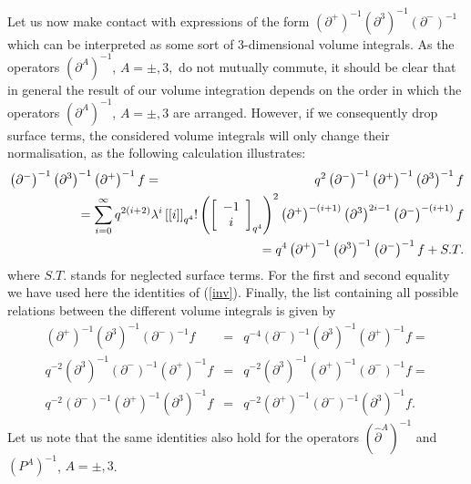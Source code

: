\documentclass[a4paper,11pt,oneside]{article}
\begin{document}
Let us now make contact with expressions of the form $\left( \partial
^{+}\right) ^{-1}\left( \partial ^{3}\right) ^{-1}\left( \partial
^{-}\right) ^{-1}$ which can be interpreted as some sort of 3-dimensional
volume integrals. As the operators $\left( \partial ^{A}\right) ^{-1}$, $%
A=\pm ,3,$ do not mutually commute, it should be clear that in general the
result of our volume integration depends on the order in which the operators 
$\left( \partial ^{A}\right) ^{-1}$, $A=\pm ,3$ are arranged. However, if we
consequently drop surface terms, the considered volume integrals will only
change their normalisation, as the following calculation illustrates: 
\begin{eqnarray}
\left( \partial ^{-}\right) ^{-1}\left( \partial ^{3}\right) ^{-1}\left(
\partial ^{+}\right) ^{-1}f &=&q^{2}\left( \partial ^{-}\right) ^{-1}\left(
\partial ^{+}\right) ^{-1}\left( \partial ^{3}\right) ^{-1}f \\
&&\hspace*{-2.5cm}=\sum_{i=0}^{\infty }q^{2\left( i+2\right) }\lambda
^{i}\left[ \left[ i\right] \right] _{q^{4}}!\left(\left[
    \begin{array}{c} -1\\i\end{array} \right]_{q^{4}}\right)
^{2}\left( \partial ^{+}\right) ^{-\left( i+1\right) }\left( \partial
^{3}\right) ^{2i-1}\left( \partial ^{-}\right) ^{-\left( i+1\right) }f 
\nonumber \\
&&\hspace*{-2.5cm}=q^{4}\left( \partial ^{+}\right) ^{-1}\left( \partial
^{3}\right) ^{-1}\left( \partial ^{-}\right) ^{-1}f+S.T.  \nonumber
\end{eqnarray}
where $S.T.$ stands for neglected surface terms. For the first and
second equality we have used here the identities of
(\ref{inv}). Finally, the list
containing all possible relations between the different volume integrals is
given by 
\begin{eqnarray}
\left( \partial ^{+}\right) ^{-1}\left( \partial ^{3}\right) ^{-1}\left(
\partial ^{-}\right) ^{-1}f &=&q^{-4}\left( \partial ^{-}\right) ^{-1}\left(
\partial ^{3}\right) ^{-1}\left( \partial ^{+}\right) ^{-1}f=
\label{volume3} \\
q^{-2}\left( \partial ^{3}\right) ^{-1}\left( \partial ^{-}\right)
^{-1}\left( \partial ^{+}\right) ^{-1}f &=&q^{-2}\left( \partial ^{3}\right)
^{-1}\left( \partial ^{+}\right) ^{-1}\left( \partial ^{-}\right) ^{-1}f= 
\nonumber \\
q^{-2}\left( \partial ^{-}\right) ^{-1}\left( \partial ^{+}\right)
^{-1}\left( \partial ^{3}\right) ^{-1}f &=&q^{-2}\left( \partial ^{+}\right)
^{-1}\left( \partial ^{-}\right) ^{-1}\left( \partial ^{3}\right) ^{-1}f. 
\nonumber
\end{eqnarray}
Let us note that the same identities also hold for the operators $\left( 
\hat{\partial}^{A}\right) ^{-1}$ and $\left( P^{A}\right) ^{-1}$, $A=\pm ,3$.
\end{document}
